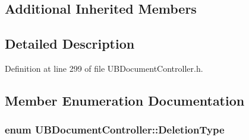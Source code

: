 \subsection*{Additional Inherited Members}


\subsection{Detailed Description}


Definition at line 299 of file U\-B\-Document\-Controller.\-h.



\subsection{Member Enumeration Documentation}
\hypertarget{class_u_b_document_controller_ad7fc793af571ee4203a71db414e0829e}{
\subsubsection[{Deletion\-Type}]{\setlength{\rightskip}{0pt plus 5cm}enum {\bf U\-B\-Document\-Controller\-::\-Deletion\-Type}}}\label{d6/de0/class_u_b_document_controller_ad7fc793af571ee4203a71db414e0829e}
